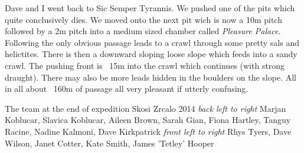 Dave and I went back to Sic Semper Tyrannis. We pushed one of the pits which quite conclusively dies. We moved onto the next pit wich is now a 10m pitch followed by a 2m pitch into a medium sized chamber called \emph{Pleasure Palace}. Following the only obvious passage leads to  a crawl through some pretty sals and helictites. There is then a downward sloping loose slope which feeds into a sandy crawl. The pushing front is ~15m into the crawl which continues (with strong draught). There may also be more leads hidden in the boulders on the slope. All in all about ~160m of passage all very pleasant if utterly confusing. 



\begin{pagefigure}
\checkoddpage \ifoddpage \forcerectofloat \else \forceversofloat \fi
\centering
{}
\caption{The team at the end of expedition Skosi Zrcalo 2014  \emph{back left to right} Marjan Koblucar, Slavica Koblucar, Aileen Brown, Sarah Gian, Fiona Hartley, Tanguy Racine, Nadine Kalmoni, Dave Kirkpatrick \emph{front left to right} Rhys Tyers, Dave Wilson, Janet Cotter, Kate Smith, James 'Tetley' Hooper}
\label{end of expo}
\end{pagefigure}




\begin{figure}[t!]
\centering
{}
\caption{}
\label{}
\end{figure}

\begin{figure}[t!]
\centering
{}
\caption{}
\label{}
\end{figure}